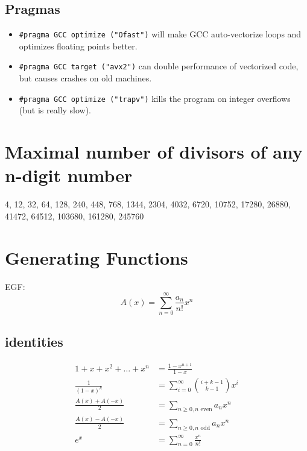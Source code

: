 	\subsection{Pragmas}
		\begin{itemize}
			\item \lstinline{#pragma GCC optimize ("Ofast")} will make GCC auto-vectorize loops and optimizes floating points better.
			\item \lstinline{#pragma GCC target ("avx2")} can double performance of vectorized code, but causes crashes on old machines.
			\item \lstinline{#pragma GCC optimize ("trapv")} kills the program on integer overflows (but is really slow).
		\end{itemize}

\section{Maximal number of divisors of any n-digit number}
4, 12, 32, 64, 128, 240, 448, 768, 1344, 2304, 4032, 6720, 10752, 17280, 26880, 41472, 64512, 103680, 161280, 245760

\section{Generating Functions}
EGF: \[A(x) = \sum_{n = 0}^{\infty} \frac{a_n}{n!}x^n\]

\subsection{identities}
\begin{align*}
1 + x + x^2 + \dots + x^n &= \frac{1 - x^{n + 1}}{1 - x}\\
\frac{1}{(1 - x)^k} &= \sum_{i = 0}^{\infty} \binom{i + k - 1}{k - 1} x^i  \\
\frac{A(x) + A(-x)}{2} &= \sum_{n \ge 0, n \text{ even}} a_n x^n \\
\frac{A(x) - A(-x)}{2} &= \sum_{n \ge 0, n \text{ odd}} a_n x^n \\
e^{x} &= \sum_{n = 0}^{\infty} \frac{x^n}{n!}
\end{align*}

